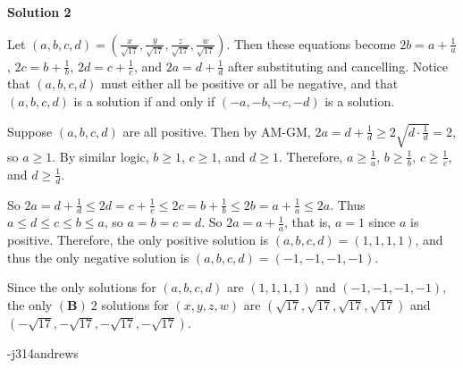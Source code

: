 \begin{enumerate}
 



\textbf{Solution 2}

Let $(a, b, c, d) = \left(\frac{x}{\sqrt{17}}, \frac{y}{\sqrt{17}}, \frac{z}{\sqrt{17}}, \frac{w}{\sqrt{17}}\right)$.  Then these equations become $2b = a + \frac{1}{a}$, $2c = b + \frac{1}{b}$, $2d = c + \frac{1}{c}$, and $2a = d + \frac{1}{d}$ after substituting and cancelling.  Notice that $(a, b, c, d)$ must either all be positive or all be negative, and that $(a, b, c, d)$ is a solution if and only if $(-a, -b, -c, -d)$ is a solution.

 Suppose $(a, b, c, d)$ are all positive.  Then by AM-GM, $2a = d + \frac{1}{d} \geq 2\sqrt{d \cdot \frac{1}{d}} = 2$, so $a \geq 1$.  By similar logic, $b \geq 1$, $c \geq 1$, and $d \geq 1$.  Therefore, $a \geq \frac{1}{a}$, $b \geq \frac{1}{b}$, $c \geq \frac{1}{c}$, and $d \geq \frac{1}{d}$.

 So $2a = d + \frac{1}{d} \leq 2d = c + \frac{1}{c} \leq 2c = b + \frac{1}{b} \leq 2b = a + \frac{1}{a} \leq 2a$.  Thus $a \leq d \leq c \leq b \leq a$, so $a = b = c = d$.  So $2a = a + \frac{1}{a}$, that is, $a = 1$ since $a$ is positive.  Therefore, the only positive solution is $(a, b, c, d) = (1, 1, 1, 1)$, and thus the only negative solution is $(a, b, c, d) = (-1, -1, -1, -1)$.

 Since the only solutions for $(a, b, c, d)$ are $(1, 1, 1, 1)$ and $(-1, -1, -1, -1)$, the only $\boxed{(\mathbf{B})\ 2}$ solutions for $(x, y, z, w)$ are $(\sqrt{17}, \sqrt{17}, \sqrt{17}, \sqrt{17})$ and $(-\sqrt{17}, -\sqrt{17}, -\sqrt{17}, -\sqrt{17})$.

 -j314andrews

 


\end{enumerate}